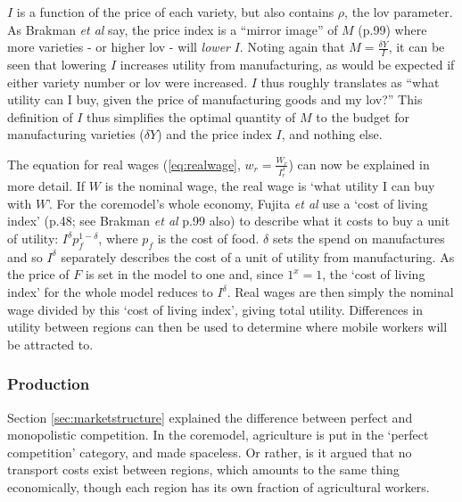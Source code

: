 $I$ is a function of the price of each variety, but also contains $\rho$, the \gls{lov} parameter. As Brakman \emph{et al} say, the price index is a ``mirror image'' of $M$ (p.99) where more varieties - or higher \gls{lov} - will \emph{lower} $I$. Noting again that $M = \frac{\delta Y}{I}$, it can be seen that lowering $I$ increases utility from manufacturing, as would be expected if either variety number or \gls{lov} were increased. $I$ thus roughly translates as ``what utility can I buy, given the price of manufacturing goods and my \gls{lov}?'' This definition of $I$ thus simplifies the optimal quantity of $M$ to the budget for manufacturing varieties ($\delta Y$) and the price index $I$, and nothing else. 

The equation for real wages (\ref{eq:realwage}, $w_{r}=\frac{W_{r}}{I_{r}^\delta}$) can now be explained in more detail. If $W$ is the nominal wage, the real wage is `what utility I can buy with $W$'. For the \gls{coremodel}'s whole economy, Fujita \emph{et al} use a `cost of living index' (p.48; see Brakman \emph{et al} p.99 also) to describe what it costs to buy a unit of utility: $I^\delta p_{f}^{1-\delta}$, where $p_{f}$ is the cost of food. $\delta$ sets the spend on manufactures and so $I^\delta$ separately describes the cost of a unit of utility from manufacturing. As the price of $F$ is set in the model to one and, since $1^x = 1$, the `cost of living index' for the whole model reduces to $I^\delta$. Real wages are then simply the nominal wage divided by this `cost of living index', giving total utility. Differences in utility between regions can then be used to determine where mobile workers will be attracted to.


\subsubsection{Production \label{sec:CMproduction}}
Section \ref{sec:marketstructure} explained the difference between perfect and monopolistic competition. In the \gls{coremodel}, agriculture is put in the `perfect competition' category, and made spaceless. Or rather, is it argued that no transport costs exist between regions, which amounts to the same thing economically, though each region has its own fraction of agricultural workers. 

